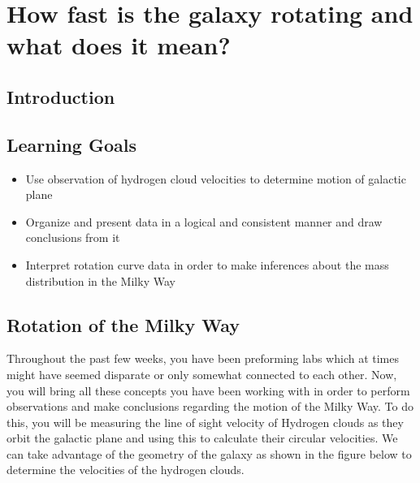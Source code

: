 \chapter{How fast is the galaxy rotating and what does it mean?}

\section{Introduction}

\section{Learning Goals}
\begin{itemize}
	\item Use observation of hydrogen cloud velocities to determine motion of galactic plane
	
	\item Organize and present data in a logical and consistent manner and draw conclusions from it
	
	\item Interpret rotation curve data in order to make inferences about the mass distribution in the Milky Way
\end{itemize}

\section{Rotation of the Milky Way}

Throughout the past few weeks, you have been preforming labs which at times might have seemed disparate or only somewhat connected to each other. Now, you will bring all these concepts you have been working with in order to perform observations and make conclusions regarding the motion of the Milky Way. To do this, you will be measuring the line of sight velocity of Hydrogen clouds as they orbit the galactic plane and using this to calculate their circular velocities. We can take advantage of the geometry of the galaxy as shown in the figure below to determine the velocities of the hydrogen clouds.

